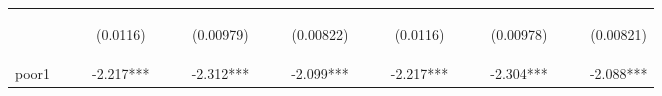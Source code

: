 \documentclass[]{article}
\begin{document}
\begin{center}
\begin{tabular}{lcccccccccccccccccc}
\vspace{4pt} & \begin{footnotesize}\end{footnotesize} & \begin{footnotesize}\end{footnotesize} & \begin{footnotesize}(0.0116)\end{footnotesize} & \begin{footnotesize}\end{footnotesize} & \begin{footnotesize}\end{footnotesize} & \begin{footnotesize}(0.00979)\end{footnotesize} & \begin{footnotesize}\end{footnotesize} & \begin{footnotesize}\end{footnotesize} & \begin{footnotesize}(0.00822)\end{footnotesize} & \begin{footnotesize}\end{footnotesize} & \begin{footnotesize}\end{footnotesize} & \begin{footnotesize}(0.0116)\end{footnotesize} & \begin{footnotesize}\end{footnotesize} & \begin{footnotesize}\end{footnotesize} & \begin{footnotesize}(0.00978)\end{footnotesize} & \begin{footnotesize}\end{footnotesize} & \begin{footnotesize}\end{footnotesize} & \begin{footnotesize}(0.00821)\end{footnotesize} \\
poor1 &  &  & -2.217*** &  &  & -2.312*** &  &  & -2.099*** &  &  & -2.217*** &  &  & -2.304*** &  &  & -2.088*** \\

\end{tabular}
\end{center}
\end{document}
